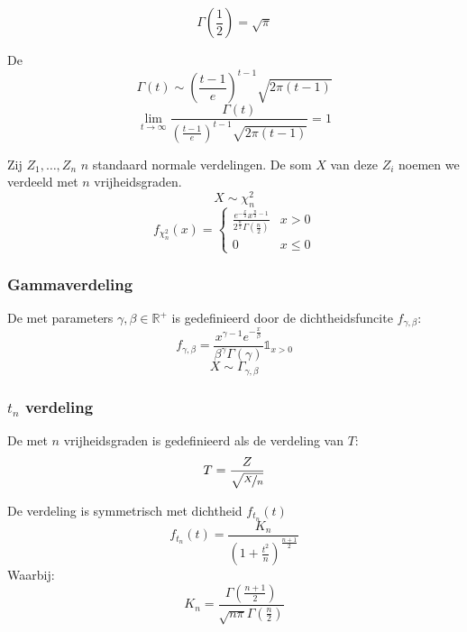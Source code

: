 \documentclass[main.tex]{subfiles}
\begin{document}
\begin{st}
  \[ \Gamma\left(\frac{1}{2}\right) = \sqrt{\pi} \]
\end{st}

\begin{st}
  De 
  \[
  \Gamma(t) \sim \left(\frac{t-1}{e}\right)^{t-1}\sqrt{2\pi(t-1)}
  \]
  \[
  \lim_{t\rightarrow \infty}\frac{\Gamma(t)}{\left(\frac{t-1}{e}\right)^{t-1}\sqrt{2\pi(t-1)}} = 1
  \]
\end{st}

\begin{de}
  Zij $Z_{1}, \dotsc, Z_{n}$ $n$ standaard normale verdelingen.
  De som $X$ van deze $Z_{i}$ noemen we  verdeeld met $n$ vrijheidsgraden.
  \[ X \sim \chi_{n}^{2} \]
  \[
  f_{\chi^{2}_{n}}(x) =
  \left\{
    \begin{array}{ll}
      \frac{e^{-\frac{x}{2}}x^{\frac{n}{2} - 1}}{2^{\frac{n}{2}}\Gamma\left(\frac{n}{2}\right)} & x > 0\\
      0 & x \le 0
    \end{array}
  \right.
  \]
\end{de}

\subsubsection{Gammaverdeling}
\label{sec:gammaverdeling}

\begin{de}
  De  met parameters $\gamma, \beta \in \mathbb{R}^{+}$ is gedefinieerd door de dichtheidsfuncite $f_{\gamma,\beta}$:
  \[ f_{\gamma,\beta} = \frac{x^{\gamma-1}e^{-\frac{x}{\beta}}}{\beta^{\gamma}\Gamma(\gamma)}\mathbb{1}_{x > 0} \]
  \[ X \sim \Gamma_{\gamma,\beta} \]
\end{de}

\subsubsection{$t_n$ verdeling}
\label{sec:t_n-verdeling}

\begin{de}
  De  met $n$ vrijheidsgraden is gedefinieerd als de verdeling van $T$:
  \[ T = \frac{Z}{\sqrt{\nicefrac{X}{n}}} \]
\end{de}

\begin{st}
  De verdeling is symmetrisch met dichtheid $f_{t_{n}}(t)$
  \[ f_{t_{n}}(t) = \frac{K_{n}}{\left(1+\frac{t^{2}}{n}\right)^{\frac{n+1}{2}}} \]
  Waarbij:
  \[ K_{n} = \frac{\Gamma\left(\frac{n+1}{2}\right)}{\sqrt{n\pi}\Gamma\left(\frac{n}{2}\right)} \]
\zb
\end{st}
\end{document}
